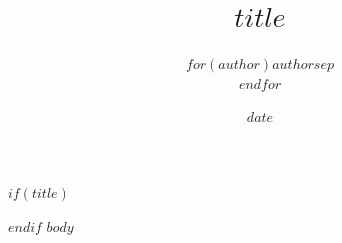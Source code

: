 \documentclass[11pt]{article}
\title{$title$}
\author{$for(author)$$author$$sep$ \\ $endfor$}
\date{$date$}
\date{}
\begin{document}
$if(title)$
\maketitle
$endif$
$body$
\end{document}
